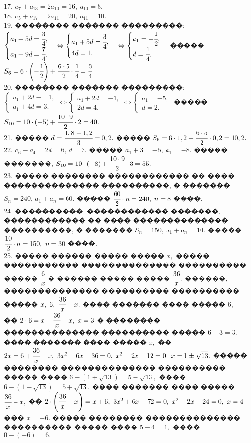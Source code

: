 \documentclass[12pt]{article}
\begin{document}
17. $a_7+a_{13}=2a_{10}=16,\ a_{10}=8.$\\
18. $a_5+a_{17}=2a_{11}=20,\ a_{11}=10.$\\
19. �������� ������� ���������: $\begin{cases}a_1+5d=\cfrac{3}{4},\\a_1+9d=\cfrac{7}{4}.\end{cases}\Leftrightarrow\begin{cases}a_1+5d=\cfrac{3}{4},\\4d=1.\end{cases}
\Leftrightarrow\begin{cases}a_1=-\cfrac{1}{2},\\d=\cfrac{1}{4}.\end{cases}$ ����� $S_6=6\cdot\left(-\cfrac{1}{2}\right)+\cfrac{6\cdot5}{2}\cdot\cfrac{1}{4}=\cfrac{3}{4}.$\\
20. �������� ������� ���������: $\begin{cases}a_1+2d=-1,\\a_1+4d=3.\end{cases}\Leftrightarrow\begin{cases}a_1+2d=-1,\\2d=4.\end{cases}
\Leftrightarrow\begin{cases}a_1=-5,\\d=2.\end{cases}$ ����� $S_{10}=10\cdot\left(-5\right)+\cfrac{10\cdot9}{2}\cdot2=40.$\\
21. ����� $d=\cfrac{1,8-1,2}{3}=0,2.$ ����� $S_6=6\cdot1,2+\cfrac{6\cdot5}{2}\cdot0,2=10,2.$\\
22. $a_6-a_4=2d=6,\ d=3.$ ����� $a_1+3=-5,\ a_1=-8.$ ����� �������, $S_{10}=10\cdot(-8)+\cfrac{10\cdot9}{2}\cdot3=55.$\\
23. ����� �������� ������������ �� ���� �������������� ����������, � ������� $S_n=240,\ a_1+a_n=60.$ ����� $\cfrac{60}{2}\cdot n=240,\ n=8$ ����.\\
24. ����������, ������������ �������, ������������ �� ���� �������������� ����������, � ������� $S_n=150,\ a_1+a_n=10.$ ����� $\cfrac{10}{2}\cdot n=150,\ n=30$ ����.\\
25. ����� ������ ����� ����� $x,$ ����� ����������� �������������� ���������� ����� $\cfrac{6}{x}$ � ������ ����� ����� $\cfrac{36}{x}.$ ������, �������������� ���������� ���������� ����� $x,\ 6,\ \cfrac{36}{x}-x.$ ���� ������� ���� ����� 6, �� $2\cdot6=x+\cfrac{36}{x}-x,\ x=3$ � �������� �������������� ���������� ����� $6-3=3.$ ���� ������� ���� ����� $x,$ �� $2x=6+\cfrac{36}{x}-x,\ 3x^2-6x-36=0,\ x^2-2x-12=0,\ x=1\pm\sqrt{13}.$ ����� �������� �������������� ���������� ����� ���� $6-(1+\sqrt{13})=5-\sqrt{13},$ ���� $6-(1-\sqrt{13})=5+\sqrt{13}.$ ���� ������� ���� ����� $\cfrac{36}{x}-x,$ �� $2\cdot\left(\cfrac{36}{x}-x\right)=x+6,\ 3x^2+6x-72=0,\ x^2+2x-24=0,\ x=4$ ��� $x=-6.$ ����� �������� �������������� ���������� ����� ���� $5-4=1,$ ���� $0-(-6)=6.$\\
\end{document}
